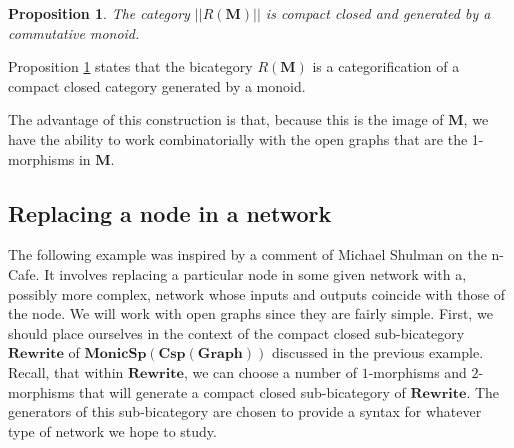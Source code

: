 \documentclass[11pt]{amsart}
\newcommand{\cat}[1]{\mathbf{#1}}
\newcommand{\bimonspcsp}[1]{\mathbf{MonicSp(Csp(#1))}}
\newtheorem{prop}[thm]{Proposition}
\theoremstyle{remark}
\theoremstyle{definition}
\begin{document}
\begin{prop}
	\label{thm:SyntaxMonoid}
	The category 
		$|| R ( \cat{ M } ) ||$ 
	is compact closed and 
	generated by a commutative monoid.
\end{prop}

Proposition \ref{thm:SyntaxMonoid} states 
that the bicategory 
	$ R ( \cat{ M } ) $ 
is a categorification of a 
compact closed category generated by a monoid. 


The advantage of this construction is that,
because this is the image of 
	$ \cat{ M } $, 
we have the ability to work 
combinatorially with the open graphs
that are the 1-morphisms in $\cat{M}$.  


\subsection{Replacing a node in a network}

The following example was inspired 
by a comment of Michael Shulman \cite{Shul} 
on the n-Cafe.
It involves replacing a particular node 
in some given network with a, 
possibly more complex, 
network whose inputs and outputs 
coincide with those of the node. 
We will work with open graphs
since they are fairly simple.
First, we should place ourselves
in the context of the 
compact closed sub-bicategory
$\cat{Rewrite}$ of $\bimonspcsp{Graph}$
discussed in the previous example. 
Recall, that within $\cat{Rewrite}$,
we can choose a number of $1$-morphisms 
and $2$-morphisms that will generate 
a compact closed sub-bicategory of $\cat{Rewrite}$.
The generators of this sub-bicategory
are chosen to provide a syntax
for whatever type of network we hope to study.
\end{document}

